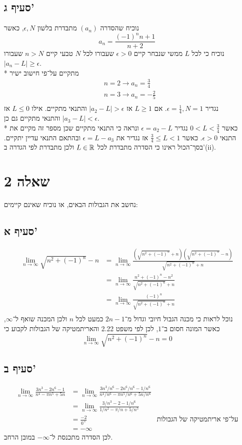 \subsection{סעיף ג'}
נוכיח שהסדרה $(a_n)$ מתבדרת בלשון $\epsilon, N$, כאשר
$$
	a_n = \frac{{(-1)}^n n + 1}{n + 2}
$$
נוכיח כי לכל $L$ ממשי שנבחר קיים $\epsilon > 0$ שעבורו לכל $N$ טבעי קיים $n > N$ שעבורו $\left| a_n - L \right| \ge \epsilon$. \\*
מתקיים על־פי חישוב ישיר
\begin{align*}
	& n = 2 \rightarrow a_n = \frac{3}{4} \\
	& n = 3 \rightarrow a_n = -\frac{2}{5} \\
\end{align*}
נגדיר $\epsilon = \frac{1}{4}, N = 1$.
אם $L \ge 1$ אז $|a_2 - L| > \epsilon$ והתנאי מתקיים.
אילו $L \le 0$ אז $|a_3 - L| < \epsilon$ והתנאי מתקיים גם כן. \\*
כאשר $0 < L < \frac{3}{4}$ נגדיר $\epsilon = a_2 - L$ ונראה כי התנאי מתקיים שכן מספר זה מקיים את התנאי $\epsilon > 0$.
כאשר $\frac{3}{4} \le L < 1$ אז נגדיר את $\epsilon = L - a_3$ ובהתאם התנאי עדיין יתקיים.
בסך־הכול ראינו כי הסדרה מתבדרת לכל $L \in \mathbb{R}$ ולכן מתבדרת לפי הגדרה ב'(ii).

\section{שאלה 2}
נחשב את הגבולות הבאים, או נוכיח שאינם קיימים:

\subsection{סעיף א'}
\begin{align*}
	\lim_{n \to \infty} \sqrt{n^2 + {(-1)}^n} - n
	& = \lim_{n \to \infty} \frac{\left(\sqrt{n^2 + {(-1)}^n} + n\right)\left(\sqrt{n^2 + {(-1)}^n} - n\right)}{\sqrt{n^2 + {(-1)}^n} + n} \\
	& = \lim_{n \to \infty} \frac{n^2 + {(-1)}^n - n^2}{\sqrt{n^2 + {(-1)}^n} + n} \\
	& = \lim_{n \to \infty} \frac{{(-1)}^n}{\sqrt{n^2 + {(-1)}^n} + n} \\
\end{align*}
נוכל לראות כי מכנה הגבול חיובי וגדול מ־$2n - 1$ כמעט לכל $n$ ולכן המכנה שואף ל־$\infty$, כאשר המונה חסום ב־$1$,
לכן לפי משפט 2.22 והאריתמטיקה של הגבולות לקבוע כי
$$
	\lim_{n \to \infty} \sqrt{n^2 + {(-1)}^n} - n = 0
$$

\subsection{סעיף ב'}
\begin{align*}
	\lim_{n \to \infty} \frac{3n^3 - 2n^6 - 1}{n^4 - \pi n^5 + 5n}
	& = \lim_{n \to \infty} \frac{3n^3/n^6 - 2n^6/n^6 - 1/n^6}{n^4/n^6 - \pi n^5/n^6 + 5n/n^6} \\
	& = \lim_{n \to \infty} \frac{3/n^3 - 2 - 1/n^6}{1/n^2 - \pi /n + 5/n^5} \\
	& = \frac{-2}{0^+} & \text{על־פי אריתמטיקה של הגבולות} \\
	& = -\infty
\end{align*}
לכן הסדרה מתכנסת ל־$-\infty$ במובן הרחב.

